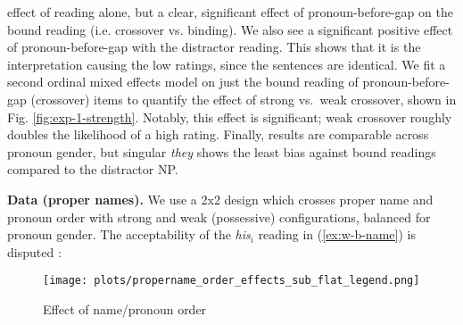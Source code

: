 \documentclass[12pt,letterpaper]{article}
\newcommand{\sectitle}[1]{\smallskip \textbf{#1.}}
\begin{document}
effect of reading alone,
but a clear, significant effect of pronoun-before-gap on the bound reading (i.e. crossover vs. binding). %
We also see a significant positive effect of pronoun-before-gap with the distractor
reading. %
This shows that it is the interpretation causing the low ratings, since the sentences are identical.
We fit a second ordinal mixed effects model on just the bound reading of pronoun-before-gap (crossover) items %
to quantify the effect of strong vs.~weak crossover, shown in Fig. \ref{fig:exp-1-strength}. 
Notably, this effect is significant; weak crossover roughly doubles the likelihood of a high rating.
Finally, results are comparable across pronoun gender, but singular \emph{they} shows the least bias against bound readings compared to the distractor NP.

\sectitle{Data (proper names)} We use a 2x2 design which crosses proper name and pronoun order with strong and weak (possessive) configurations, balanced for pronoun gender. The acceptability of the \emph{his}$_i$ reading in (\ref{ex:w-b-name}) is disputed
\citep{chomsky_conditions_1976,lasnik_weakest_1991}: %

\begin{wrapfigure}[3]{r}{0.48\textwidth}
\centering
\texttt{[image: plots/propername\_order\_effects\_sub\_flat\_legend.png]}
\caption{Effect of name/pronoun order}
\label{fig:exp-3-names}
\end{wrapfigure}
\end{document}
